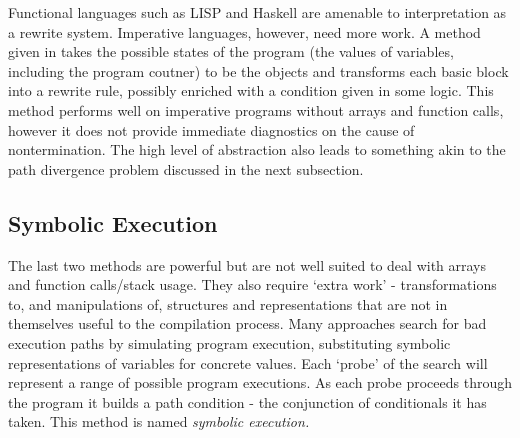\documentclass[12pt,a4paper]{article}
\begin{document}
Functional languages such as LISP and Haskell are amenable to interpretation as a rewrite system. Imperative languages, however, need more work. A method given in \citep{tra} takes the possible states of the program (the values of variables, including the program coutner) to be the objects and transforms each basic block into a rewrite rule, possibly enriched with a condition given in some logic. This method performs well on imperative programs without arrays and function calls, however
it does not provide immediate diagnostics on the cause of nontermination. The high level of abstraction also leads to something akin to the path divergence problem
discussed in the next subsection.

\subsection{Symbolic Execution}\label{revSymEx}
The last two methods are powerful but are not well suited to deal with arrays and function calls/stack usage. They also require `extra work' - transformations to, and manipulations of, structures and representations that are not in themselves useful to the compilation process. Many approaches search for bad execution paths by
simulating program execution, substituting symbolic representations of variables for concrete values. Each `probe' of the search will represent a range of possible program executions. As each
probe proceeds through the program it builds a path condition - the conjunction of conditionals it has taken. This method is named \emph{symbolic execution.}\\
\end{document}
